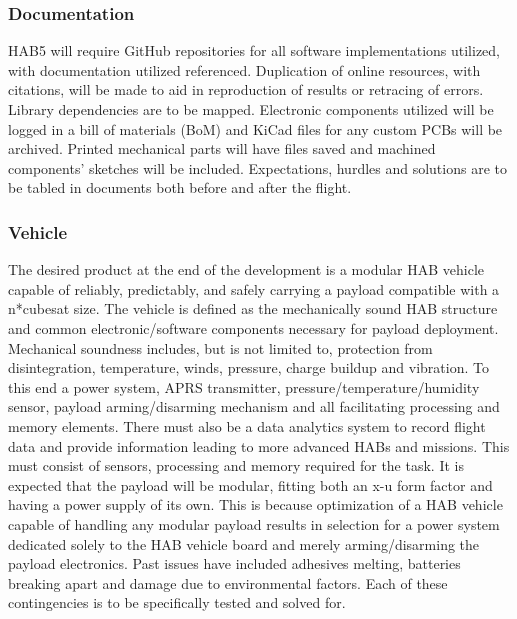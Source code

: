 \documentclass[conference]{IEEEtran} %
\begin{document}
\subsubsection{Documentation}
 HAB5 will require GitHub repositories for all software implementations utilized, with documentation utilized referenced. Duplication of online resources, with citations, will be made to aid in reproduction of results or retracing of errors. 
 Library dependencies are to be mapped. 
 Electronic components utilized will be logged in a bill of materials (BoM) and KiCad files for any custom PCBs will be archived. 
 Printed mechanical parts will have files saved and machined components' sketches will be included. 
 Expectations, hurdles and solutions are to be tabled in documents both before and after the flight.

\subsubsection{Vehicle}
The desired product at the end of the development is a modular HAB vehicle capable of reliably, predictably, and safely carrying a payload compatible with a n*cubesat size. 
The vehicle is defined as the mechanically sound HAB structure and common electronic/software components necessary for payload deployment. 
Mechanical soundness includes, but is not limited to, protection from disintegration, temperature, winds, pressure, charge buildup and vibration. 
To this end a power system, APRS transmitter, pressure/temperature/humidity sensor, payload arming/disarming mechanism and all facilitating processing and memory elements. 
There must also be a data analytics system to record flight data and provide information leading to more advanced HABs and missions. 
This must consist of sensors, processing and memory required for the task.
It is expected that the payload will be modular, fitting both an x-u form factor and having a power supply of its own. 
This is because optimization of a HAB vehicle capable of handling any modular payload results in selection for a power system dedicated solely to the HAB vehicle board and merely arming/disarming the payload electronics. Past issues have included adhesives melting, batteries breaking apart and damage due to environmental factors. Each of these contingencies is to be specifically tested and solved for.
\end{document}
